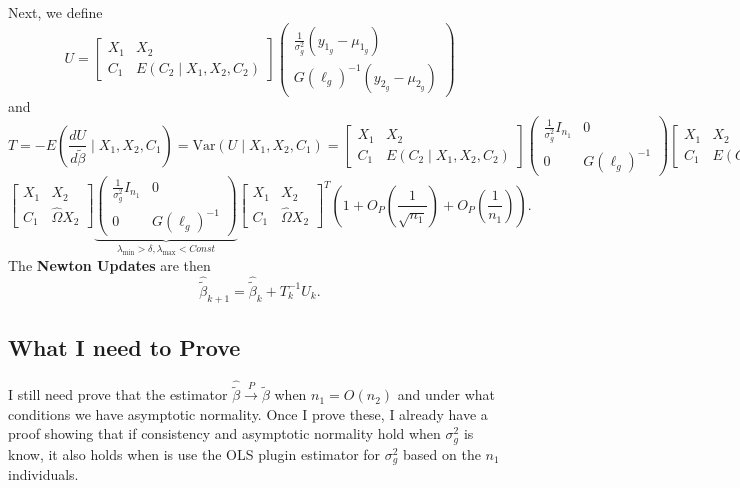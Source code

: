 \documentclass{article}
\begin{document}
Next, we define
\[
U = \left[ \begin{matrix}
X_1 & X_2\\
C_1 & E\left( C_2 \mid X_1, X_2, C_2 \right)
\end{matrix} \right] \left( \begin{matrix}
\frac{1}{\sigma_g^2} \left( y_{1_g} - \mu_{1_g} \right)\\
G\left( \ell_g \right)^{-1}\left( y_{2_g} - \mu_{2_g} \right)
\end{matrix} \right)
\]
and
\[
T = -E\left( \frac{dU}{d\tilde{\beta}} \mid X_1, X_2, C_1 \right) = \text{Var}\left( U \mid X_1, X_2, C_1 \right) = \left[ \begin{matrix}
X_1 & X_2\\
C_1 & E\left( C_2 \mid X_1, X_2, C_2 \right)
\end{matrix} \right] \left( \begin{matrix}
\frac{1}{\sigma_g^2} I_{n_1} & 0\\
0 & G\left( \ell_g \right)^{-1}
\end{matrix} \right) \left[ \begin{matrix}
X_1 & X_2\\
C_1 & E\left( C_2 \mid X_1, X_2, C_2 \right)
\end{matrix} \right]^T
\]
\[
\left[ \begin{matrix}
X_1 & X_2\\
C_1 & \hat{\Omega} X_2
\end{matrix} \right] \underbrace{\left( \begin{matrix}
\frac{1}{\sigma_g^2} I_{n_1} & 0\\
0 & G\left( \ell_g \right)^{-1}
\end{matrix} \right)}_{\lambda_{\min} > \delta, \lambda_{\max} < Const} \left[ \begin{matrix}
X_1 & X_2\\
C_1 & \hat{\Omega} X_2
\end{matrix} \right]^T \left( 1 + O_P\left( \frac{1}{\sqrt{n_1}} \right) + O_P\left( \frac{1}{n_1} \right) \right).
\]
The \textbf{Newton Updates} are then
\[
\hat{\tilde{\beta}}_{k+1} = \hat{\tilde{\beta}}_{k} + T_{k}^{-1} U_{k}.
\]

\subsection{What I need to Prove}
I still need prove that the estimator $\hat{\tilde{\beta}} \stackrel{P}{\to} \tilde{\beta}$ when $n_1 = O\left( n_2 \right)$ and under what conditions we have asymptotic normality. Once I prove these, I already have a proof showing that if consistency and asymptotic normality hold when $\sigma_g^2$ is know, it also holds when is use the OLS plugin estimator for $\sigma_g^2$ based on the $n_1$ individuals.
\end{document}
